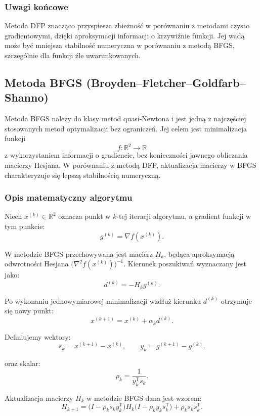 \documentclass[10pt,a4paper]{article}
\begin{document}
\subsubsection{Uwagi końcowe}

Metoda DFP znacząco przyspiesza zbieżność w porównaniu z metodami
czysto gradientowymi, dzięki aproksymacji informacji o krzywiźnie
funkcji. Jej wadą może być mniejsza stabilność numeryczna w porównaniu
z metodą BFGS, szczególnie dla funkcji źle uwarunkowanych.

\subsection{Metoda BFGS (Broyden--Fletcher--Goldfarb--Shanno)}

Metoda BFGS należy do klasy metod quasi-Newtona i jest jedną z
najczęściej stosowanych metod optymalizacji bez ograniczeń.
Jej celem jest minimalizacja funkcji
\[
f:\mathbb{R}^2 \to \mathbb{R}
\]
z wykorzystaniem informacji o gradiencie, bez konieczności jawnego
obliczania macierzy Hesjana. W porównaniu z metodą DFP, aktualizacja
macierzy w BFGS charakteryzuje się lepszą stabilnością numeryczną.



\subsubsection{Opis matematyczny algorytmu}

Niech $x^{(k)} \in \mathbb{R}^2$ oznacza punkt w $k$-tej iteracji algorytmu,
a gradient funkcji w tym punkcie:
\[
g^{(k)} = \nabla f(x^{(k)}).
\]

W metodzie BFGS przechowywana jest macierz $H_k$, będąca aproksymacją
odwrotności Hesjana $\bigl(\nabla^2 f(x^{(k)})\bigr)^{-1}$.
Kierunek poszukiwań wyznaczany jest jako:
\[
d^{(k)} = - H_k g^{(k)}.
\]

Po wykonaniu jednowymiarowej minimalizacji wzdłuż kierunku $d^{(k)}$
otrzymuje się nowy punkt:
\[
x^{(k+1)} = x^{(k)} + \alpha_k d^{(k)}.
\]

Definiujemy wektory:
\[
s_k = x^{(k+1)} - x^{(k)}, \qquad
y_k = g^{(k+1)} - g^{(k)}.
\]

oraz skalar:
\[
\rho_k = \frac{1}{y_k^{\mathsf T} s_k}.
\]

Aktualizacja macierzy $H_k$ w metodzie BFGS dana jest wzorem:
\[
H_{k+1}
=
\bigl(I - \rho_k s_k y_k^{\mathsf T}\bigr)
H_k
\bigl(I - \rho_k y_k s_k^{\mathsf T}\bigr)
+
\rho_k s_k s_k^{\mathsf T}.
\]
\end{document}
